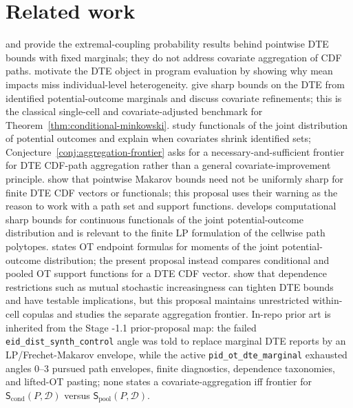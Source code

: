 \documentclass[11pt]{article}
\theoremstyle{definition}
\theoremstyle{plain}
\theoremstyle{remark}
\begin{document}
\section{Related work}
\citet{Makarov1981} and \citet{Rueschendorf1982} provide the extremal-coupling probability results behind pointwise DTE bounds with fixed marginals; they do not address covariate aggregation of CDF paths.  \citet{HeckmanSmithClements1997} motivate the DTE object in program evaluation by showing why mean impacts miss individual-level heterogeneity.  \citet[Section 2]{FanPark2010} give sharp bounds on the DTE from identified potential-outcome marginals and discuss covariate refinements; this is the classical single-cell and covariate-adjusted benchmark for Theorem~\ref{thm:conditional-minkowski}.  \citet[abstract and Sections 2--3]{FanGuerreZhu2017} study functionals of the joint distribution of potential outcomes and explain when covariates shrink identified sets; Conjecture~\ref{conj:aggregation-frontier} asks for a necessary-and-sufficient frontier for DTE CDF-path aggregation rather than a general covariate-improvement principle.  \citet[Section 2]{FirpoRidder2019} show that pointwise Makarov bounds need not be uniformly sharp for finite DTE CDF vectors or functionals; this proposal uses their warning as the reason to work with a path set and support functions.  \citet{Russell2021} develops computational sharp bounds for continuous functionals of the joint potential-outcome distribution and is relevant to the finite LP formulation of the cellwise path polytopes.  \citet{OberReynolds2023} states OT endpoint formulas for moments of the joint potential-outcome distribution; the present proposal instead compares conditional and pooled OT support functions for a DTE CDF vector.  \citet{FrandsenLefgren2021} show that dependence restrictions such as mutual stochastic increasingness can tighten DTE bounds and have testable implications, but this proposal maintains unrestricted within-cell copulas and studies the separate aggregation frontier.  In-repo prior art is inherited from the Stage -1.1 prior-proposal map: the failed \texttt{eid\_dist\_synth\_control} angle was told to replace marginal DTE reports by an LP/Frechet-Makarov envelope, while the active \texttt{pid\_ot\_dte\_marginal} exhausted angles 0--3 pursued path envelopes, finite diagnostics, dependence taxonomies, and lifted-OT pasting; none states a covariate-aggregation iff frontier for \(\mathsf S_{\mathrm{cond}}(P,\mathcal D)\) versus \(\mathsf S_{\mathrm{pool}}(P,\mathcal D)\).
\end{document}
